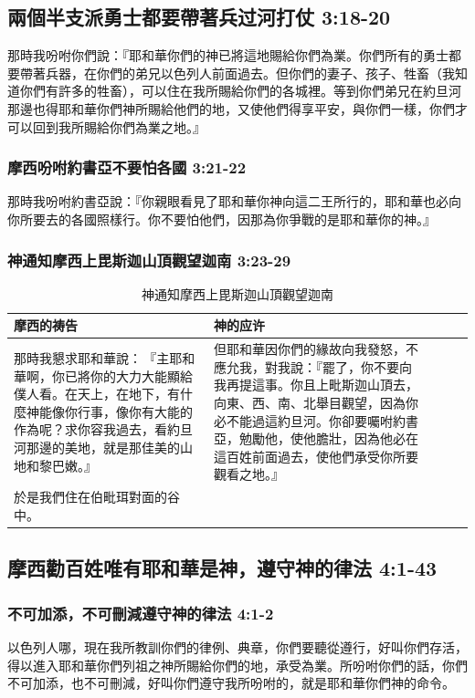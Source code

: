 \subsection{兩個半支派勇士都要帶著兵过河打仗 3:18-20}
那時我吩咐你們說：『耶和華你們的神已將這地賜給你們為業。你們所有的勇士都要帶著兵器，在你們的弟兄以色列人前面過去。但你們的妻子、孩子、牲畜（我知道你們有許多的牲畜），可以住在我所賜給你們的各城裡。等到你們弟兄在約旦河那邊也得耶和華你們神所賜給他們的地，又使他們得享平安，與你們一樣，你們才可以回到我所賜給你們為業之地。』

\subsubsection{摩西吩咐約書亞不要怕各國 3:21-22}
那時我吩咐約書亞說：『你親眼看見了耶和華你神向這二王所行的，耶和華也必向你所要去的各國照樣行。你不要怕他們，因那為你爭戰的是耶和華你的神。』

\subsubsection{神通知摩西上毘斯迦山頂觀望迦南 3:23-29}
\begin{table}[H]
\begin{threeparttable}
\begin{tabular}{@{}p{}*{4}{L{\tabcolsep\relax}}@{}}
\toprule
摩西的祷告&神的应许 \\\hline
那時我懇求耶和華說： 『主耶和華啊，你已將你的大力大能顯給僕人看。在天上，在地下，有什麼神能像你行事，像你有大能的作為呢？求你容我過去，看約旦河那邊的美地，就是那佳美的山地和黎巴嫩。』&但耶和華因你們的緣故向我發怒，不應允我，對我說：『罷了，你不要向我再提這事。你且上毗斯迦山頂去，向東、西、南、北舉目觀望，因為你必不能過這約旦河。你卻要囑咐約書亞，勉勵他，使他膽壯，因為他必在這百姓前面過去，使他們承受你所要觀看之地。』\tabularnewline\hline
於是我們住在伯毗珥對面的谷中。&\tabularnewline\hline
\bottomrule
\end{tabular}
\caption{神通知摩西上毘斯迦山頂觀望迦南}
\end{threeparttable}
\end{table} 


\subsection{摩西勸百姓唯有耶和華是神，遵守神的律法 4:1-43}
\subsubsection{不可加添，不可刪減遵守神的律法 4:1-2}
以色列人哪，現在我所教訓你們的律例、典章，你們要聽從遵行，好叫你們存活，得以進入耶和華你們列祖之神所賜給你們的地，承受為業。所吩咐你們的話，你們不可加添，也不可刪減，好叫你們遵守我所吩咐的，就是耶和華你們神的命令。 

